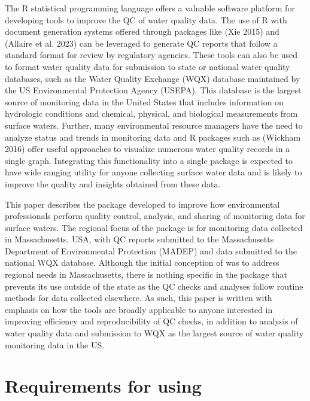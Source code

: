 The R statistical programming language offers a valuable software platform for developing tools to improve the QC of water quality data. The use of R with document generation systems offered through packages like  (Xie 2015) and  (Allaire et al. 2023) can be leveraged to generate QC reports that follow a standard format for review by regulatory agencies. These tools can also be used to format water quality data for submission to state or national water quality databases, such as the Water Quality Exchange (WQX) database maintained by the US Environmental Protection Agency (USEPA). This database is the largest source of monitoring data in the United States that includes information on hydrologic conditions and chemical, physical, and biological measurements from surface waters. Further, many environmental resource managers have the need to analyze status and trends in monitoring data and R packages such as  (Wickham 2016) offer useful approaches to visualize numerous water quality records in a single graph. Integrating this functionality into a single package is expected to have wide ranging utility for anyone collecting surface water data and is likely to improve the quality and insights obtained from these data.

This paper describes the  package developed to improve how environmental professionals perform quality control, analysis, and sharing of monitoring data for surface waters. The regional focus of the package is for monitoring data collected in Massachusetts, USA, with QC reports submitted to the Massachusetts Department of Environmental Protection (MADEP) and data submitted to the national WQX database. Although the initial conception of  was to address regional needs in Massachusetts, there is nothing specific in the package that prevents its use outside of the state as the QC checks and analyses follow routine methods for data collected elsewhere. As such, this paper is written with emphasis on how the tools are broadly applicable to anyone interested in improving efficiency and reproducibility of QC checks, in addition to analysis of water quality data and submission to WQX as the largest source of water quality monitoring data in the US.

\hypertarget{requirements-for-using}{%
\section{\texorpdfstring{Requirements for using }{Requirements for using }}\label{requirements-for-using}}

